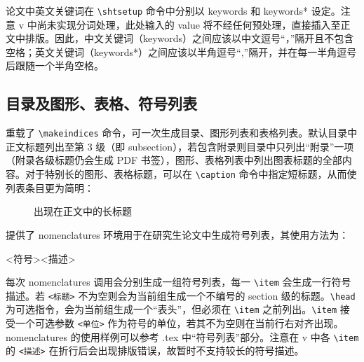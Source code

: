 \documentclass[master]{shtthesis}
\begin{document}
论文中英文关键词在 \verb|\shtsetup| 命令中分别以 keywords 和 keywords* 设定。注意 \shtthesis{} v\version{} 中尚未实现分词处理，此处输入的 value 将不经任何预处理，直接插入至正文中排版。因此，中文关键词（keywords）之间应该以中文逗号“，”隔开且不包含空格；英文关键词（keywords*）之间应该以半角逗号“,”隔开，并在每一半角逗号后跟随一个半角空格。
\begin{latex}
\end{latex}

\subsection{目录及图形、表格、符号列表}
\shtthesis{} 重载了 \verb|\makeindices| 命令，可一次生成目录、图形列表和表格列表。默认目录中正文标题列出至第 3 级（即 subsection），若包含附录则目录中只列出“附录”一项（附录各级标题仍会生成 PDF 书签），图形、表格列表中列出图表标题的全部内容。对于特别长的图形、表格标题，可以在 \verb|\caption| 命令中指定短标题，从而使列表条目更为简明：
\begin{latex}
\begin{figure}
  \caption[出现在图形列表内的短标题]{出现在正文中的长标题}
\end{figure}
\end{latex}

\shtthesis{} 提供了 nomenclatures 环境用于在研究生论文中生成符号列表，其使用方法为：
\begin{latex}
\begin{nomenclatures}[<标题>]
  \item[<单位>]{<符号>}{<描述>}
\end{nomenclatures}
\end{latex}
每次 nomenclatures 调用会分别生成一组符号列表，每一 \verb|\item| 会生成一行符号描述。若 \verb|<标题>| 不为空则会为当前组生成一个不编号的 section 级的标题。\verb|\head| 为可选指令，会为当前组生成一个“表头”，但必须在 \verb|\item| 之前列出。\verb|\item| 接受一个可选参数 \verb|<单位>| 作为符号的单位，若其不为空则在当前行右对齐出现。nomenclatures 的使用样例可以参考 \jobname.tex 中“符号列表”部分。注意在 \shtthesis{} v\version{} 中各 \verb|\item| 的 \verb|<描述>| 在折行后会出现排版错误，故暂时不支持较长的符号描述。
\end{document}

